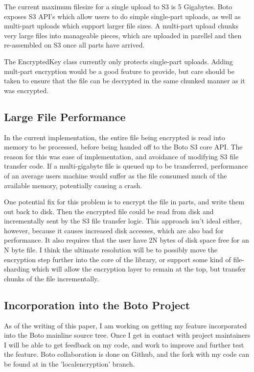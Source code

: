 The current maximum filesize for a single upload to S3 is 5 Gigabytes. Boto exposes S3 API's which allow users to do simple
single-part uploads, as well as multi-part uploads which support larger file sizes. A multi-part upload chunks very large 
files into manageable pieces, which are uploaded in parellel and then re-assembled on S3 once all parts have arrived.

The EncryptedKey class currently only protects single-part uploads. Adding mult-part encryption would be a good feature
to provide, but care should be taken to ensure that the file can be decrypted in the same chunked manner as it was
encrypted.

\subsection{Large File Performance}

In the current implementation, the entire file being encrypted is read into memory to be processed, before being handed off
to the Boto S3 core API. The reason for this was ease of implementation, and avoidance of modifying S3 file transfer code.
If a multi-gigabyte file is queued up to be transferred, performance of an average users machine would suffer as the file 
consumed much of the available memory, potentially causing a crash.

One potential fix for this problem is to encrypt the file in parts, and write them out back to disk. Then the encrypted file could be read from disk and incrementally sent by the S3 file transfer logic. This approach isn't ideal either, however, because it causes
increased disk accesses, which are also bad for performance. It also requires that the user have 2N bytes of disk 
space free for an N byte file. I think the ultimate resolution will be to possibly move the encryption step further into the core
of the library, or support some kind of file-sharding which will allow the encryption layer to remain at the top, but transfer chunks of the file incrementally.

\subsection{Incorporation into the Boto Project}
As of the writing of this paper, I am working on getting my feature incorporated into the Boto mainline source tree. Once I 
get in contact with project maintainers I will be able to get feedback on my code, and work to improve and further test the
feature. Boto collaboration is done on Github, and the fork with my code can be found at \cite{CodyBoto} in the 'localencryption' branch.


